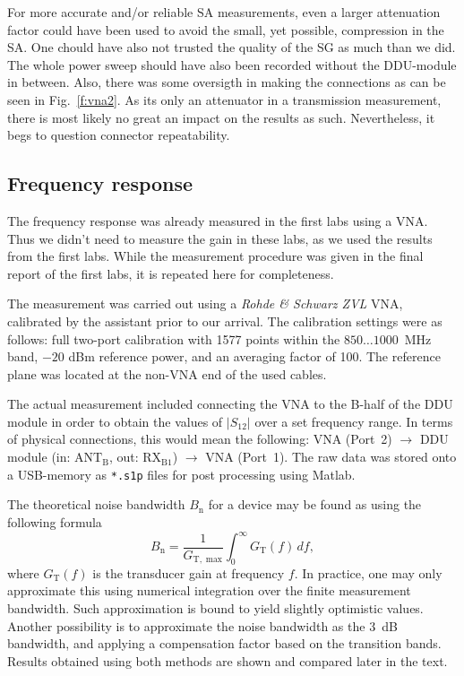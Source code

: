 \documentclass[a4paper, 12pt]{article}
\begin{document}
For more accurate and/or reliable SA measurements, even a larger attenuation factor 
could have been used to avoid the small, yet possible, compression in the SA. One 
chould have also not trusted the quality of the SG as much than we did. The whole 
power sweep should have also been recorded without the DDU-module in between.
Also, there was some oversigth in making the connections as can be seen in 
Fig.~\ref{f:vna2}. As its only an attenuator in a transmission measurement, 
there is most likely no great an impact on the results as such. Nevertheless, 
it begs to question connector repeatability.


\subsection{Frequency response}

The frequency response was already measured in the first labs using a VNA. Thus 
we didn't need to measure the gain in these labs, as we used the results from 
the first labs. While the measurement procedure was given in the final report of 
the first labs, it is repeated here for completeness.

The measurement was carried out using a \textit{Rohde \& Schwarz ZVL} VNA, 
calibrated by the assistant prior to our arrival. The calibration settings were 
as follows: full two-port calibration with 1577 points within the $850 \ldots 1000$~MHz 
band, $-20$ dBm reference power, and an averaging factor of 100. The reference 
plane was located at the non-VNA end of the used cables.

The actual measurement included connecting the VNA to the B-half of the DDU module in 
order to obtain the values of $|S_{12}|$ over a set frequency range. In terms of physical 
connections, this would mean the following: VNA (Port~2) $\rightarrow$ DDU module 
(in: $\mathrm{ANT}_\mathrm{B}$, out: $\mathrm{RX}_\mathrm{B1}$) $\rightarrow$ VNA (Port~1). 
The raw data was stored onto a USB-memory as \texttt{*.s1p} files for post processing 
using Matlab.

The theoretical noise bandwidth $B_\mathrm{n}$ for a device may be found as using the 
following formula
\begin{equation}\label{e:Bn}
B_\mathrm{n} = \frac{1}{G_\mathrm{T,\;max}} \int_0^\infty G_\mathrm{T}(f) \, df,
\end{equation}
where $G_\mathrm{T}(f)$ is the transducer gain at frequency $f$. In practice, one may 
only approximate this using numerical integration over the finite measurement bandwidth. Such 
approximation is bound to yield slightly optimistic values. Another possibility is to 
approximate the noise bandwidth as the 3~dB bandwidth, and applying a compensation factor 
based on the transition bands. Results obtained using both methods are shown and compared 
later in the text.
\end{document}
